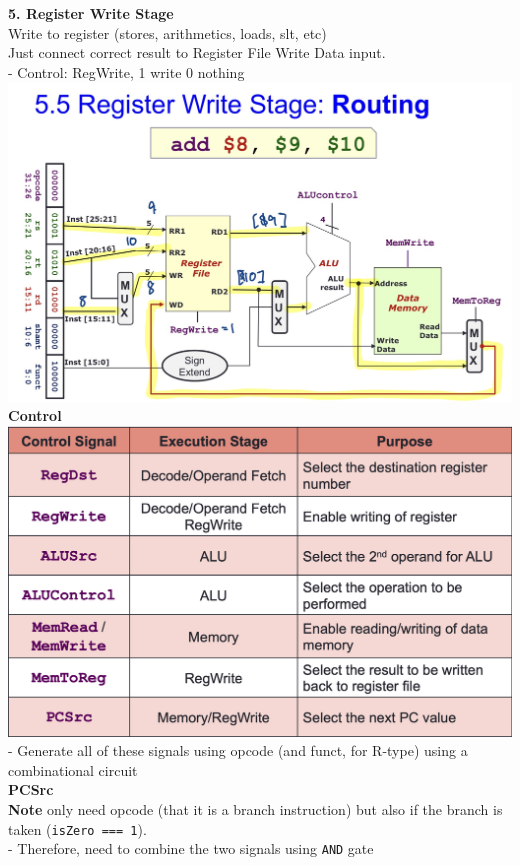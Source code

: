 \documentclass[10pt, a4paper]{article}
\newcommand{\highlight}[1]{{\color{red}\textbf{#1}}}
\begin{document}
\begin{multicols*}{3}
		\textbf{5. Register Write Stage}\\
		Write to register (stores, arithmetics, loads, slt, etc)\\
		Just connect correct result to Register File Write Data input.\\
		- Control: RegWrite, 1 write 0 nothing\\
		\includegraphics[scale=0.16]{./assets/regWrite}\\
		
		{\normalsize\textbf{Control}}\\
		\includegraphics[scale=.26]{./assets/controlSignals}\\
		- Generate all of these signals using opcode (and funct, for R-type) using a combinational circuit\\
		
		\textbf{PCSrc}\\
		\highlight{Note} only need opcode (that it is a branch instruction) but also if the branch is taken (\texttt{isZero === 1}).\\
		- Therefore, need to combine the two signals using \texttt{AND} gate\\
		

\end{multicols*}
\end{document}
